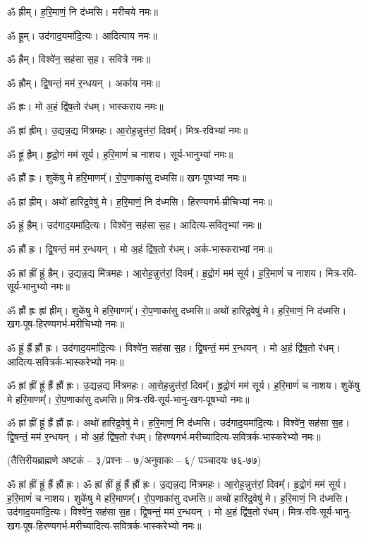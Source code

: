 ॐ ह्रीम्।  ह॒रि॒माणं॒ नि द॑ध्मसि। मरीचये नमः॥

ॐ ह्रूम्।  उद॑गाद॒यमा॑दि॒त्यः। आदित्याय नमः॥

ॐ ह्रैम्।  विश्वे॑न॒ सह॑सा स॒ह। सवित्रे नमः॥

ॐ ह्रौम्।  द्वि॒षन्तं॒ मम॑ र॒न्धयन्। अर्काय नमः॥

ॐ ह्रः। मो अ॒हं द्वि॑ष॒तो र॑धम्। भास्कराय नमः॥


ॐ ह्रां ह्रीम्। उ॒द्यन्न॒द्य मि॑त्रमहः।  आ॒रोह॒न्नुत्त॑रां॒ दिवम्᳚। मित्र-रविभ्यां नमः॥

ॐ ह्रूं ह्रैम्। हृ॒द्रो॒गं मम॑ सूर्य। ह॒रि॒माणं॑ च नाशय। सूर्य-भानुभ्यां नमः॥

ॐ ह्रौं ह्रः। शुके॑षु मे हरि॒माणम्᳚। रो॒प॒णाका॑सु दध्मसि॥ खग-पूषभ्यां नमः॥

ॐ ह्रां ह्रीम्। अथो॑ हारिद्र॒वेषु॑ मे। ह॒रि॒माणं॒ नि द॑ध्मसि। हिरण्यगर्भ-म्रीचिभ्यां नमः॥

ॐ ह्रूं ह्रैम्। उद॑गाद॒यमा॑दि॒त्यः। विश्वे॑न॒ सह॑सा स॒ह। आदित्य-सवितृभ्यां नमः॥

ॐ ह्रौं ह्रः। द्वि॒षन्तं॒ मम॑ र॒न्धयन्। मो अ॒हं द्वि॑ष॒तो र॑धम्। अर्क-भास्कराभ्यां नमः॥


ॐ ह्रां ह्रीं ह्रूं ह्रैम्। उ॒द्यन्न॒द्य मि॑त्रमहः। आ॒रोह॒न्नुत्त॑रां॒ दिवम्᳚। हृ॒द्रो॒गं मम॑ सूर्य। ह॒रि॒माणं॑ च नाशय। मित्र-रवि-सूर्य-भानुभ्यो नमः॥

ॐ ह्रौं ह्रः ह्रां ह्रीम्। शुके॑षु मे हरि॒माणम्᳚। रो॒प॒णाका॑सु दध्मसि॥ अथो॑ हारिद्र॒वेषु॑ मे। ह॒रि॒माणं॒ नि द॑ध्मसि। खग-पूष-हिरण्यगर्भ-मरीचिभ्यो नमः॥

ॐ ह्रूं ह्रैं ह्रौं ह्रः। उद॑गाद॒यमा॑दि॒त्यः। विश्वे॑न॒ सह॑सा स॒ह। द्वि॒षन्तं॒ मम॑ र॒न्धयन्। मो अ॒हं द्वि॑ष॒तो र॑धम्। आदित्य-सवित्रर्क-भास्करेभ्यो नमः॥

ॐ ह्रां ह्रीं ह्रूं ह्रैं ह्रौं ह्रः।
उ॒द्यन्न॒द्य मि॑त्रमहः। आ॒रोह॒न्नुत्त॑रां॒ दिवम्᳚। हृ॒द्रो॒गं मम॑ सूर्य। ह॒रि॒माणं॑ च नाशय। शुके॑षु मे हरि॒माणम्᳚। रो॒प॒णाका॑सु दध्मसि॥ 
मित्र-रवि-सूर्य-भानु-खग-पूषभ्यो नमः॥


ॐ ह्रां ह्रीं ह्रूं ह्रैं ह्रौं ह्रः।
अथो॑ हारिद्र॒वेषु॑ मे। ह॒रि॒माणं॒ नि द॑ध्मसि। उद॑गाद॒यमा॑दि॒त्यः। विश्वे॑न॒ सह॑सा स॒ह। द्वि॒षन्तं॒ मम॑ र॒न्धयन्। मो अ॒हं द्वि॑ष॒तो र॑धम्।
हिरण्यगर्भ-मरीच्यादित्य-सवित्रर्क-भास्करेभ्यो नमः॥

\centerline{\normalsize (तैत्तिरीयब्राह्मणे अष्टकं – ३/प्रश्नः – ७/अनुवाकः – ६/ पञ्चादयः ७६-७७)}

ॐ ह्रां ह्रीं ह्रूं ह्रैं ह्रौं ह्रः। ॐ ह्रां ह्रीं ह्रूं ह्रैं ह्रौं ह्रः। 
उ॒द्यन्न॒द्य मि॑त्रमहः। 
आ॒रोह॒न्नुत्त॑रां॒ दिवम्᳚।
हृ॒द्रो॒गं मम॑ सूर्य।
ह॒रि॒माणं॑ च नाशय।
शुके॑षु मे हरि॒माणम्᳚।
रो॒प॒णाका॑सु दध्मसि॥
अथो॑ हारिद्र॒वेषु॑ मे।
ह॒रि॒माणं॒ नि द॑ध्मसि।
उद॑गाद॒यमा॑दि॒त्यः।
विश्वे॑न॒ सह॑सा स॒ह।
द्वि॒षन्तं॒ मम॑ र॒न्धयन्।
मो अ॒हं द्वि॑ष॒तो र॑धम्।
मित्र-रवि-सूर्य-भानु-खग-पूष-हिरण्यगर्भ-मरीच्यादित्य-सवित्रर्क-भास्करेभ्यो नमः॥

